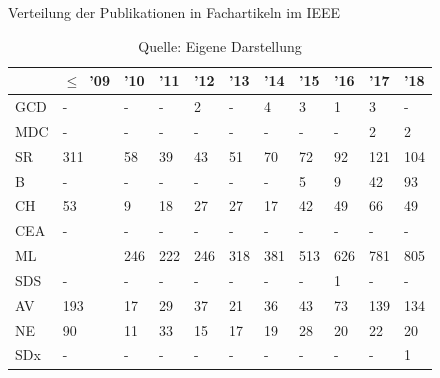 \begin{table}[ht]
\caption{Verteilung der Publikationen in Fachartikeln im \glqq IEEE\grqq}
\centering
\label{tab:dist_ieee_art}
\begin{tabularx}{\linewidth}{X|X|X|X|X|X|X|X|X|X|X}
	& $\leq$~'09 & '10 & '11 & '12 & '13 & '14 & '15 & '16 & '17 & '18 \\
	\hline
	GCD & - & - & - & 2 & - & 4 & 3 & 1 & 3 & - \\
	\hline
	MDC & - & - & - & - & - & - & - & - & 2 & 2 \\
	\hline
	SR & 311 & 58 & 39 & 43 & 51 & 70 & 72 & 92 & 121 & 104 \\
	\hline
	B & - & - & - & - & - & - & 5 & 9 & 42 & 93 \\
	\hline
	CH & 53 & 9 & 18 & 27 & 27 & 17 & 42 & 49 & 66 & 49 \\
	\hline
	CEA & - & - & - & - & - & - & - & - & - & - \\
	\hline
	ML & \numprint{1551} & 246 & 222 & 246 & 318 & 381 & 513 & 626 & 781 & 805 \\
	\hline
	SDS & - & - & - & - & - & - & - & 1 & - & - \\
	\hline
	AV & 193 & 17 & 29 & 37 & 21 & 36 & 43 & 73 & 139 & 134 \\
	\hline
	NE & 90 & 11 & 33 & 15 & 17 & 19 & 28 & 20 & 22 & 20 \\
	\hline
	SDx & - & - & - & - & - & - & - & - & - & 1 \\
\end{tabularx}
\caption*{Quelle: Eigene Darstellung}
\end{table}

